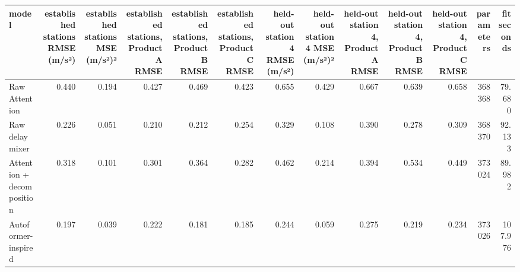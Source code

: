 \begin{tabular}{lrrrrrrrrrrrr}
\toprule
model & established stations RMSE (m/s²) & established stations MSE (m/s²)² & established stations, Product A RMSE & established stations, Product B RMSE & established stations, Product C RMSE & held-out station 4 RMSE (m/s²) & held-out station 4 MSE (m/s²)² & held-out station 4, Product A RMSE & held-out station 4, Product B RMSE & held-out station 4, Product C RMSE & parameters & fit seconds \\
\midrule
Raw Attention & 0.440 & 0.194 & 0.427 & 0.469 & 0.423 & 0.655 & 0.429 & 0.667 & 0.639 & 0.658 & 368368 & 79.680 \\
Raw delay mixer & 0.226 & 0.051 & 0.210 & 0.212 & 0.254 & 0.329 & 0.108 & 0.390 & 0.278 & 0.309 & 368370 & 92.133 \\
Attention + decomposition & 0.318 & 0.101 & 0.301 & 0.364 & 0.282 & 0.462 & 0.214 & 0.394 & 0.534 & 0.449 & 373024 & 89.982 \\
Autoformer-inspired & 0.197 & 0.039 & 0.222 & 0.181 & 0.185 & 0.244 & 0.059 & 0.275 & 0.219 & 0.234 & 373026 & 107.976 \\
\bottomrule
\end{tabular}
